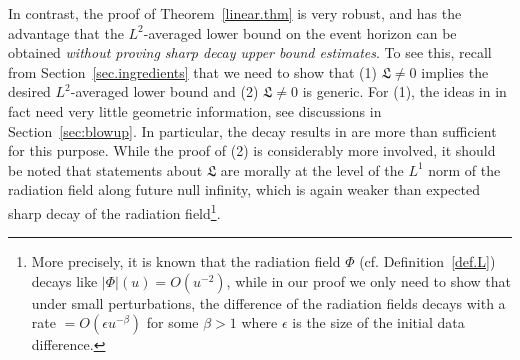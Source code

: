 \documentclass[10pt, reqno]{amsart}
\theoremstyle{definition}
\theoremstyle{remark}
\theoremstyle{conjecture}
\numberwithin{equation}{section}
\newcommand{\0}{\emptyset}
\newcommand{\bt}{\beta}
\newcommand{\eps}{\epsilon}
\begin{document}
In contrast, the proof of Theorem~\ref{linear.thm} is very robust, and has the advantage that the $L^2$-averaged lower bound on the event horizon can be obtained \emph{without proving sharp decay upper bound estimates}. To see this, recall from Section~\ref{sec.ingredients} that we need to show that (1) $\mathfrak L\neq 0$ implies the desired $L^2$-averaged lower bound and (2) $\mathfrak L\neq 0$ is generic. For (1), the ideas in \cite{LO.interior} in fact need very little geometric information, see discussions in Section~\ref{sec:blowup}. In particular, the decay results in \cite{DRPL} are more than sufficient for this purpose. While the proof of (2) is considerably more involved, it should be noted that statements about $\mathfrak L$ are morally at the level of the $L^1$ norm of the radiation field along future null infinity, which is again weaker than expected sharp decay of the radiation field\footnote{More precisely, it is known \cite{DRPL} that the radiation field $\Phi$ (cf. Definition~\ref{def.L}) decays like $|\Phi|(u) = O(u^{-2})$, while in our proof we only need to show that under small perturbations, the difference of the radiation fields decays with a rate $= O(\eps u^{-\bt})$ for some $\bt > 1$ where $\eps$ is the size of the initial data difference.}.
\end{document}
